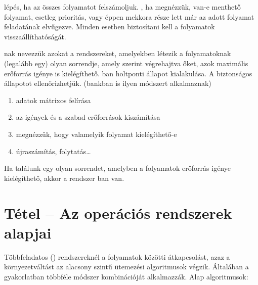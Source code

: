 \documentclass[main.tex]{subfiles}
\begin{document}
   lépés, ha az összes folyamatot felszámoljuk.
  , ha megnézzük, van-e menthető folyamat, esetleg
  prioritás, vagy éppen mekkora része lett már az adott
  folyamat feladatának elvűgezve. Minden esetben biztosítani
  kell a folyamatok visszaállíthatóságát.

  nak nevezzük azokat a
   rendszereket, amelyekben
  létezik a folyamatoknak (legalább egy) olyan sorrendje,
  amely szerint végrehajtva őket, azok maximális
  erőforrás igénye is kielégíthető. ban  holtponti állapot
  kialakulása. A biztonságos állapotot  ellenőrizhetjük. (bankban is ilyen
  módszert alkalmaznak)

  \begin{enumerate}
    \item adatok mátrixos felírása
    \item az igények és a szabad erőforrások kiszámítása
    \item megnézzük, hogy valamelyik folyamat kielégíthető-e
    \item újraszámítás, folytatás\dots
  \end{enumerate}
  Ha találunk egy olyan sorrendet,
  amelyben a folyamatok erőforrás igénye kielégíthető,
  akkor a rendszer ban van.

  \section{Tétel – Az operációs rendszerek alapjai} %
  
  Többfeladatos () rendszereknél
  a folyamatok közötti átkapcsolást,
  azaz a környezetváltást az alacsony szintű
  ütemezési algoritmusok végzik.
  Általában a gyakorlatban többféle módszer
  kombinációját alkalmazzák. Alap algoritmusok:
\end{document}
